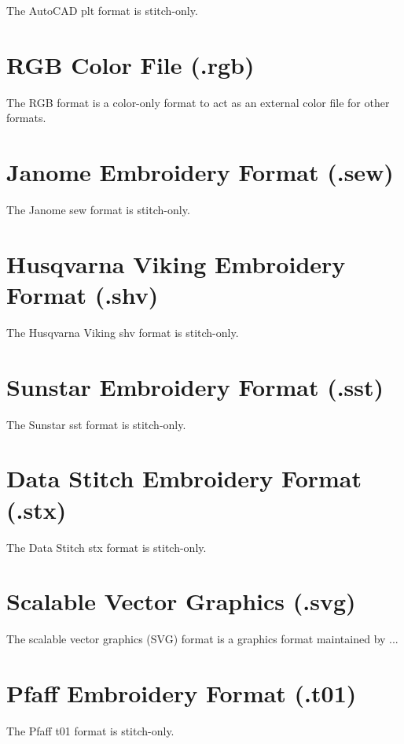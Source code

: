 The AutoCAD plt format is stitch-only.

\section{RGB Color File (.rgb)}

The RGB format is a color-only format to act as an external color file for other formats.

\section{Janome Embroidery Format (.sew)}

The Janome sew format is stitch-only.

\section{Husqvarna Viking Embroidery Format (.shv)}

The Husqvarna Viking shv format is stitch-only.

\section{Sunstar Embroidery Format (.sst)}

The Sunstar sst format is stitch-only.

\section{Data Stitch Embroidery Format (.stx)}

The Data Stitch stx format is stitch-only.

\section{Scalable Vector Graphics (.svg)}

The scalable vector graphics (SVG) format is a graphics format
maintained by ...

\section{Pfaff Embroidery Format (.t01)}

The Pfaff t01 format is stitch-only.

